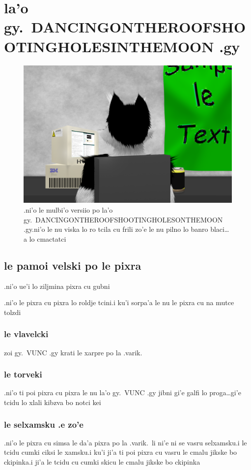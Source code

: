 \documentclass{report}
\begin{document}
\chapter{la'o gy.\ DANCINGONTHEROOFSHOOTINGHOLESINTHEMOON .gy}
\begin{figure}[ht]
	\centering
	\includegraphics[width=\textwidth]{dancingontheroofshootingholesinthemoon/dancingontheroofshootingholesinthemoon.png}
	\caption[center]{.ni'o le mulbi'o versiio po la'o gy.\ DANCINGONTHEROOFSHOOTINGHOLESONTHEMOON .gy\@  .ni'o le nu viska lo ro tcila cu frili zo'e le nu pilno lo banro blaci\ldots a lo cmactatci}
\end{figure}
\section{le pamoi velski po le pixra}
.ni'o ue'i lo ziljmina pixra cu gubni

.ni'o le pixra cu pixra lo roldje tcini\@  .i ku'i sorpa'a le nu le pixra cu na mutce tolzdi

\subsection{le vlavelcki}
zoi gy.\ VUNC .gy krati le xarpre po la .varik.
\subsection{le torveki}
.ni'o ti poi pixra cu pixra le nu la'o gy.\ VUNC .gy jibni gi'e galfi lo proga\ldots gi'e tcidu lo xlali kibzva bo notci kei

\subsection{le selxamsku .e zo'e}
.ni'o le pixra cu simsa le da'a pixra po la .varik.\ li ni'e ni se vasru selxamsku\@  .i le tcidu cumki ciksi le xamsku\@  .i ku'i ji'a ti poi pixra cu vasru le cmalu jikske bo ckipinka\@  .i ji'a le tcidu cu cumki skicu le cmalu jikske bo ckipinka
\end{document}
